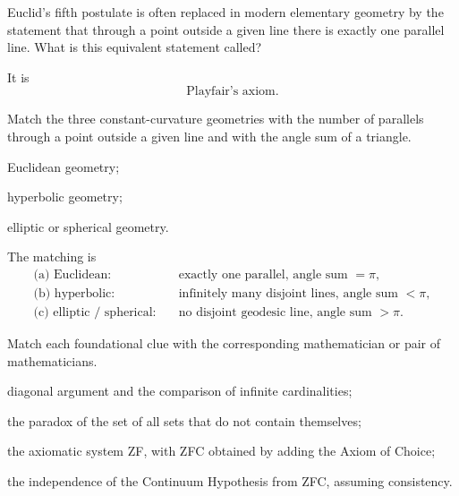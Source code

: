     \begin{expectedproblem}
        Euclid's fifth postulate is often replaced in modern elementary
        geometry by the statement that through a point outside a given line
        there is exactly one parallel line. What is this equivalent statement
        called?
    \end{expectedproblem}

    \begin{solution}
        It is
        \[
            \boxed{\text{Playfair's axiom}}.
        \]
    \end{solution}

    \begin{expectedproblem}
        Match the three constant-curvature geometries with the number of
        parallels through a point outside a given line and with the angle sum of
        a triangle.
        \begin{problemsubparts}
            \item Euclidean geometry;
            \item hyperbolic geometry;
            \item elliptic or spherical geometry.
        \end{problemsubparts}
    \end{expectedproblem}

    \begin{solution}
        The matching is
        \[
            \boxed{
                \begin{aligned}
                    \text{(a) Euclidean:}&\quad
                    \text{exactly one parallel, angle sum }=\pi,\\
                    \text{(b) hyperbolic:}&\quad
                    \text{infinitely many disjoint lines, angle sum }<\pi,\\
                    \text{(c) elliptic / spherical:}&\quad
                    \text{no disjoint geodesic line, angle sum }>\pi.
                \end{aligned}
            }
        \]
    \end{solution}

    \begin{expectedproblem}
        Match each foundational clue with the corresponding mathematician or
        pair of mathematicians.
        \begin{problemchoices}
            \item diagonal argument and the comparison of infinite
                  cardinalities;
            \item the paradox of the set of all sets that do not contain
                  themselves;
            \item the axiomatic system ZF, with ZFC obtained by adding the
                  Axiom of Choice;
            \item the independence of the Continuum Hypothesis from ZFC,
                  assuming consistency.
        \end{problemchoices}
    \end{expectedproblem}

